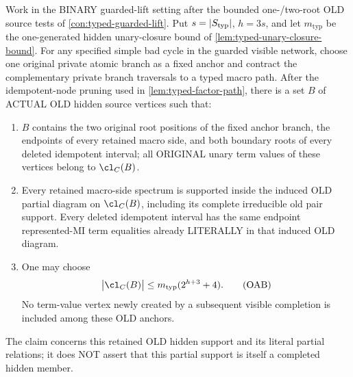 \begin{lemma}
\label{lem:typed-forest-old-anchor-bound}
Work in the BINARY guarded-lift
setting after the bounded
one-/two-root OLD source tests
of \cref{con:typed-guarded-lift}.
Put \(s=|S_{\rm typ}|\),
\(h=3s\), and let
\(m_{\mathrm{typ}}\) be the
one-generated hidden
unary-closure bound of
\cref{lem:typed-unary-closure-bound}.
For any specified simple
bad cycle in the guarded
visible network, choose one
original private atomic
branch as a fixed anchor
and contract the complementary
private branch traversals
to a typed macro path.
After the idempotent-node
pruning used in
\cref{lem:typed-factor-path},
there is a set \(B\) of
ACTUAL OLD hidden source
vertices such that:

\begin{enumerate}[label=(\roman*)]
\item \(B\) contains the
two original root positions
of the fixed anchor branch,
the endpoints of every
retained macro side, and
both boundary roots of
every deleted idempotent
interval; all ORIGINAL
unary term values of
these vertices belong to
\(\cl_C(B)\).
\item Every retained
macro-side spectrum is
supported inside the
induced OLD partial
diagram on \(\cl_C(B)\),
including its complete
irreducible old pair
support. Every deleted
idempotent interval has
the same endpoint
represented-MI term
equalities already
LITERALLY in that
induced OLD diagram.
\item One may choose
\[
 \bigl|\cl_C(B)\bigr|
   \le m_{\mathrm{typ}}
               (2^{h+3}+4).
\tag{OAB}\label{eq:typed-forest-old-anchor-bound}
\]
No term-value vertex newly
created by a subsequent
visible completion is included
among these OLD anchors.
\end{enumerate}

The claim concerns this
retained OLD hidden support
and its literal partial
relations; it does NOT
assert that this partial
support is itself a
completed hidden member.
\end{lemma}
